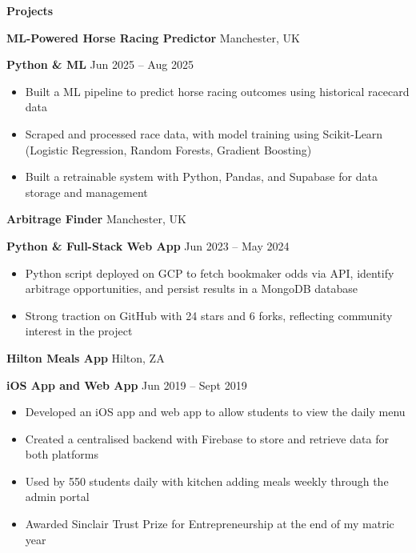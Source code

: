\documentclass[11pt]{article}
\begin{document}
\begin{center}
    \textbf{Projects}
\end{center}

\textbf{ML-Powered Horse Racing Predictor} \hfill Manchester, UK

\textbf{Python \& ML} \hfill Jun 2025 – Aug 2025
\begin{itemize}[noitemsep, topsep=0pt, partopsep=0pt, parsep=0pt]
    \item Built a ML pipeline to predict horse racing outcomes using historical racecard data
    \item Scraped and processed race data, with model training using Scikit-Learn (Logistic Regression, Random Forests, Gradient Boosting)
    \item Built a retrainable system with Python, Pandas, and Supabase for data storage and management
\end{itemize}

\vspace{4pt}

\textbf{Arbitrage Finder} \hfill Manchester, UK

\textbf{Python \& Full-Stack Web App} \hfill Jun 2023 – May 2024
\begin{itemize}[noitemsep, topsep=0pt, partopsep=0pt, parsep=0pt]
    \item Python script deployed on GCP to fetch bookmaker odds via API, identify arbitrage opportunities, and persist results in a MongoDB database
    \item Strong traction on GitHub with 24 stars and 6 forks, reflecting community interest in the project
\end{itemize}

\vspace{4pt}

\textbf{Hilton Meals App} \hfill Hilton, ZA

\textbf{iOS App and Web App} \hfill Jun 2019 – Sept 2019
\begin{itemize}[noitemsep, topsep=0pt, partopsep=0pt, parsep=0pt]
    \item Developed an iOS app and web app to allow students to view the daily menu
    \item Created a centralised backend with Firebase to store and retrieve data for both platforms
    \item Used by 550 students daily with kitchen adding meals weekly through the admin portal
    \item Awarded Sinclair Trust Prize for Entrepreneurship at the end of my matric year
\end{itemize}
\end{document}
